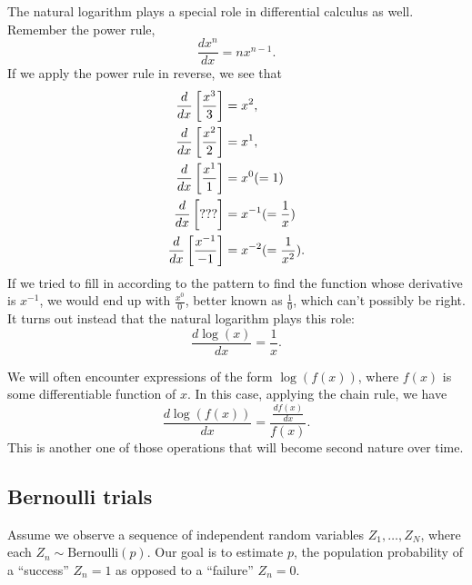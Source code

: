 \documentclass[
  12pt,
  oneside,openany]{book}
\begin{document}
The natural logarithm plays a special role in differential calculus as well.
Remember the power rule,
\[
\frac{d x^n}{d x} = n x^{n-1}.
\]
If we apply the power rule in reverse, we see that
\[
\begin{aligned}
\frac{d}{dx} \left[ \frac{x^3}{3} \right] &= x^2, \\
\frac{d}{dx} \left[ \frac{x^2}{2} \right] &= x^1, \\
\frac{d}{dx} \left[ \frac{x^1}{1} \right] &= x^0 (= 1) \\
\frac{d}{dx} \left[ \text{???} \vphantom{\frac{x^0}{0}} \right] &= x^{-1} (= \frac{1}{x}) \\
\frac{d}{dx} \left[ \frac{x^{-1}}{-1} \right] &= x^{-2} (= \frac{1}{x^2}).
\end{aligned}
\]
If we tried to fill in according to the pattern to find the function whose derivative is \(x^{-1}\), we would end up with \(\frac{x^0}{0}\), better known as \(\frac{1}{0}\), which can't possibly be right.
It turns out instead that the natural logarithm plays this role:
\[
\frac{d \log(x)}{dx} = \frac{1}{x}.
\]

We will often encounter expressions of the form \(\log(f(x))\), where \(f(x)\) is some differentiable function of \(x\).
In this case, applying the chain rule, we have
\[
\frac{d \log(f(x))}{dx} = \frac{\frac{d f(x)}{dx}}{f(x)}.
\]
This is another one of those operations that will become second nature over time.

\hypertarget{bernoulli-trials}{%
\subsection{Bernoulli trials}\label{bernoulli-trials}}

Assume we observe a sequence of independent random variables \(Z_1, \ldots, Z_N\), where each \(Z_n \sim \text{Bernoulli}(p)\).
Our goal is to estimate \(p\), the population probability of a ``success'' \(Z_n = 1\) as opposed to a ``failure'' \(Z_n = 0\).
\end{document}
